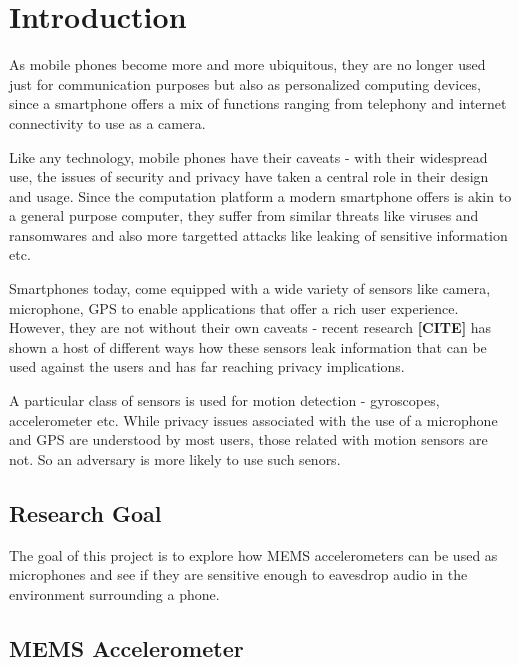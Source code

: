 \chapter{Introduction}

As mobile phones become more and more ubiquitous, they are no longer used just for communication purposes but also as personalized computing devices, since a smartphone offers a mix of functions ranging from telephony and internet connectivity to use as a camera.

Like any technology, mobile phones have their caveats - with their widespread use, the issues of security and privacy have taken a central role in their design and usage. Since the computation platform a modern smartphone offers is akin to a general purpose computer, they suffer from similar threats like viruses and ransomwares and also more targetted attacks like leaking of sensitive information etc.

Smartphones today, come equipped with a wide variety of sensors like camera, microphone, GPS to enable applications that offer a rich user experience. However, they are not without their own caveats - recent research
\textbf{[CITE]} has shown a host of different ways how these sensors leak information that can be used against the users and has far reaching privacy implications.

A particular class of sensors is used for motion detection - gyroscopes, accelerometer etc. While privacy issues associated with the use of a microphone and GPS are understood by most users, those related with motion sensors are not. So an adversary is more likely to use such senors.


\section{Research Goal}

\begin{adjustwidth}{1cm}{1cm}
The goal of this project is to explore how MEMS accelerometers can be used as microphones and see if they are sensitive enough to eavesdrop audio in the environment surrounding a phone.
\end{adjustwidth}

\newpage

\section{MEMS Accelerometer}

